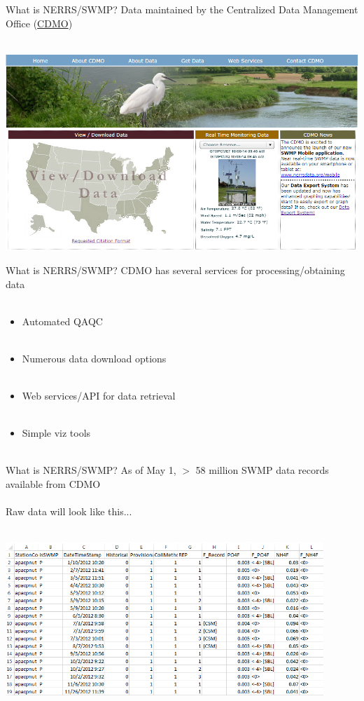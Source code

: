 \documentclass[serif]{beamer}\usepackage[]{graphicx}\usepackage[]{color}
\begin{document}
\begin{frame}[t]{What is NERRS/SWMP?}
Data maintained by the Centralized Data Management Office (\href{http://cdmo.baruch.sc.edu/}{CDMO})\\~\\
\centerline{\includegraphics[width = \textwidth]{fig/cdmo_front.png}}
\end{frame}

\begin{frame}[t]{What is NERRS/SWMP?}
CDMO has several services for processing/obtaining data\\~\\
\begin{itemize}
\item Automated QAQC \\~\\
\item Numerous data download options \\~\\
\item Web services/API for data retrieval \\~\\
\item Simple viz tools \\~\\
\end{itemize}
\end{frame}

\begin{frame}[t]{What is NERRS/SWMP?}
As of May 1, $>$ 58 million SWMP data records available from CDMO\\~\\
Raw data will look like this...\\~\\
\centerline{\includegraphics[width = 0.9\textwidth]{fig/qaqc_ex.png}}
\end{frame}
\end{document}
